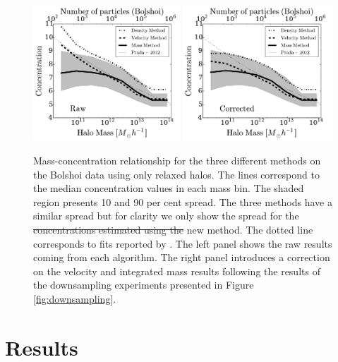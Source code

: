 \documentclass{emulateapj}
\providecommand{\DIFdel}[1]{{\protect\color{red}\sout{#1}}}                      %
\providecommand{\DIFdelFL}[1]{\DIFdel{#1}} %
\providecommand{\DIFdelbeginFL}{} %
\providecommand{\DIFdelendFL}{} %
\begin{document}
\begin{figure}
\begin{center}
  \includegraphics[width=0.49\textwidth]{concentration_bolshoi.pdf}
  \includegraphics[width=0.49\textwidth]{concentration_bolshoi_corrected.pdf}
\end{center}
\vspace{-0.5cm}
\caption{Mass-concentration relationship for the three different
  methods on the Bolshoi data using only relaxed halos.
  The lines correspond to the median concentration values in each mass
  bin.  
  The shaded region presents 10 and 90 per cent spread. 
  The three methods have a similar spread but for clarity we only show
  the spread for the \DIFdelbeginFL \DIFdelFL{concentrations estimated using the }\DIFdelendFL new method.   
  The dotted line corresponds to fits reported by \citep{Prada2012}.
  The left panel shows the raw results coming from each algorithm. 
  The right panel introduces a correction on the velocity and
  integrated mass results following the results of the downsampling
  experiments presented in Figure 
  \ref{fig:downsampling}.
  \label{fig:concentration}} 
\end{figure}


\section{Results}
\label{sec:results}
\end{document}
